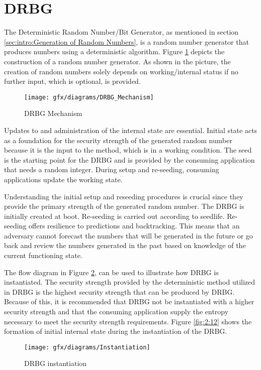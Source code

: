 %
%
\section{DRBG}
\label{sec:fundamentals:drbg}
The Deterministic Random Number/Bit Generator, as mentioned in section \ref{sec:intro:Generation of Random Numbers}, is a random number generator that produces numbers using a deterministic algorithm. Figure \ref{fig:2:10} depicts the construction of a random number generator. As shown in the picture, the creation of random numbers solely depends on working/internal status if no further input, which is optional, is provided. 
\begin{figure}[htbp]
	\centering
	\texttt{[image: gfx/diagrams/DRBG\_Mechanism]}
	\caption{DRBG Mechanism}
	\label{fig:2:10}
\end{figure}

Updates to and administration of the internal state are essential. Initial state acts as a foundation for the security strength of the generated random number because it is the input to the method, which is in a working condition. The seed is the starting point for the DRBG and is provided by the consuming application that needs a random integer. During setup and re-seeding, consuming applications update the working state.

Understanding the initial setup and reseeding procedures is crucial since they provide the primary strength of the generated random number. The DRBG is initially created at boot. Re-seeding is carried out according to seedlife. Re-seeding offers resilience to predictions and backtracking. This means that an adversary cannot forecast the numbers that will be generated in the future or go back and review the numbers generated in the past based on knowledge of the current functioning state.

The flow diagram in Figure \ref{fig:2:11}, can be used to illustrate how DRBG is instantiated. The security strength provided by the deterministic method utilized in DRBG is the highest security strength that can be produced by DRBG. Because of this, it is recommended that DRBG not be instantiated with a higher security strength and that the consuming application supply the entropy necessary to meet the security strength requirements.  Figure \ref{fig:2:12} shows the formation of initial internal state during the instantiation of the DRBG.
\begin{figure}[htbp]
	\centering
	\texttt{[image: gfx/diagrams/Instantiation]}
	\caption{DRBG instantiation}
	\label{fig:2:11}
\end{figure}

